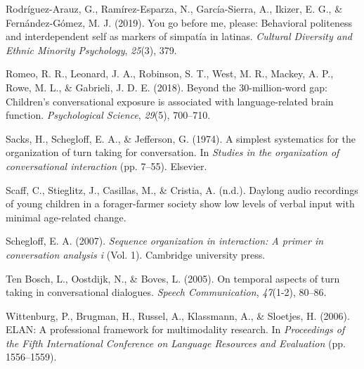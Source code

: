 \documentclass[10pt, letterpaper]{article}
\begin{document}
\leavevmode\hypertarget{ref-rodriguez2019you}{}%
Rodríguez-Arauz, G., Ramírez-Esparza, N., García-Sierra, A., Ikizer, E.
G., \& Fernández-Gómez, M. J. (2019). You go before me, please:
Behavioral politeness and interdependent self as markers of simpatía in
latinas. \emph{Cultural Diversity and Ethnic Minority Psychology},
\emph{25}(3), 379.

\leavevmode\hypertarget{ref-romeo2018beyond}{}%
Romeo, R. R., Leonard, J. A., Robinson, S. T., West, M. R., Mackey, A.
P., Rowe, M. L., \& Gabrieli, J. D. E. (2018). Beyond the
30-million-word gap: Children's conversational exposure is associated
with language-related brain function. \emph{Psychological Science},
\emph{29}(5), 700--710.

\leavevmode\hypertarget{ref-sacks1974simplest}{}%
Sacks, H., Schegloff, E. A., \& Jefferson, G. (1974). A simplest
systematics for the organization of turn taking for conversation. In
\emph{Studies in the organization of conversational interaction} (pp.
7--55). Elsevier.

\leavevmode\hypertarget{ref-scaffIPlanguage}{}%
Scaff, C., Stieglitz, J., Casillas, M., \& Cristia, A. (n.d.). Daylong
audio recordings of young children in a forager-farmer society show low
levels of verbal input with minimal age-related change.

\leavevmode\hypertarget{ref-schegloff2007sequence}{}%
Schegloff, E. A. (2007). \emph{Sequence organization in interaction: A
primer in conversation analysis i} (Vol. 1). Cambridge university press.

\leavevmode\hypertarget{ref-ten2005temporal}{}%
Ten Bosch, L., Oostdijk, N., \& Boves, L. (2005). On temporal aspects of
turn taking in conversational dialogues. \emph{Speech Communication},
\emph{47}(1-2), 80--86.

\leavevmode\hypertarget{ref-ELAN}{}%
Wittenburg, P., Brugman, H., Russel, A., Klassmann, A., \& Sloetjes, H.
(2006). ELAN: A professional framework for multimodality research. In
\emph{Proceedings of the Fifth International Conference on Language
Resources and Evaluation} (pp. 1556--1559).


\end{document}
